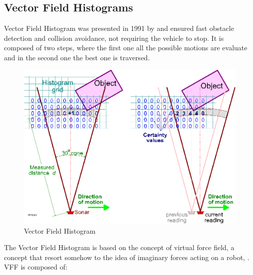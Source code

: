 \subsection{Vector Field Histograms}
Vector Field Histogram was presented in 1991 by \citet{borenstein1991} and ensured fast obstacle detection and collision avoidance, not requiring the vehicle to stop. It is composed of two steps, where the first one all the possible motions are evaluate and in the second one the best one is traversed.
    \begin{figure}[H]
        \centering
        \includegraphics[scale=0.5]{Images/Chapter 4/vff1.png}
        \caption{Vector Field Histogram}
        \label{fig:my_label}
    \end{figure}
The Vector Field Histogram is based on the concept of virtual force field, a concept that resort somehow to the idea of imaginary forces acting on a robot, \citet{1087247}.
VFF is composed of:
